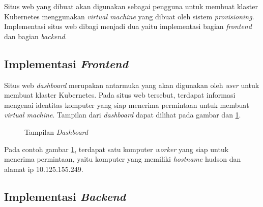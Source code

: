 Situs web yang dibuat akan digunakan sebagai pengguna untuk membuat
klaster Kubernetes menggunakan \emph{virtual machine} yang dibuat
oleh sistem \emph{provisioning}. Implementasi situs web dibagi menjadi
dua yaitu implementasi bagian \emph{frontend} dan bagian \emph{backend}.

\subsection{Implementasi \emph{Frontend}}
\label{subsec:implementas-frontend}

Situs web \emph{dashboard} merupakan antarmuka yang akan digunakan oleh \emph{user}
untuk membuat klaster Kubernetes. Pada situs web tersebut, terdapat
informasi mengenai identitas komputer yang siap
menerima permintaan untuk membuat \emph{virtual machine}.
Tampilan dari \emph{dashboard} dapat dilihat pada gambar
dan \ref{fig:dashboard-with-node}.

\begin{figure}[H]
  \centering
  \caption{Tampilan \emph{Dashboard}}
  \label{fig:dashboard-with-node}
\end{figure}

Pada contoh gambar \ref{fig:dashboard-with-node}, terdapat satu komputer \emph{worker}
yang siap untuk menerima permintaan, yaitu komputer yang memiliki \emph{hostname} hudson dan alamat
ip 10.125.155.249.

\subsection{Implementasi \emph{Backend}}
\label{subsec:implementas-backend}


